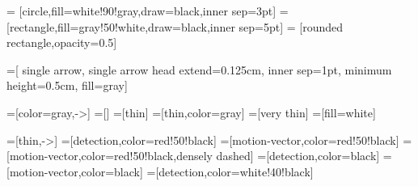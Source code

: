 \usetikzlibrary{shapes}
\usetikzlibrary{arrows}
\usetikzlibrary{fit}
\usetikzlibrary{positioning}
\usetikzlibrary{shadows}
\usetikzlibrary{calc}
\usetikzlibrary{backgrounds}
\usetikzlibrary{matrix}
\usetikzlibrary{matrix.skeleton}

=
  [circle,fill=white!90!gray,draw=black,inner sep=3pt]
=
  [rectangle,fill=gray!50!white,draw=black,inner sep=5pt]
=
  [rounded rectangle,opacity=0.5]

=[
  single arrow,
  single arrow head extend=0.125cm,
  inner sep=1pt,
  minimum height=0.5cm,
  fill=gray]

=[color=gray,->]
=[]
=[thin]
=[thin,color=gray]
=[very thin]
=[fill=white]

=[thin,->]
=[detection,color=red!50!black]
=[motion-vector,color=red!50!black]
=[motion-vector,color=red!50!black,densely dashed]
=[detection,color=black]
=[motion-vector,color=black]
=[detection,color=white!40!black]

\makeatletter
{}
\makeatother

